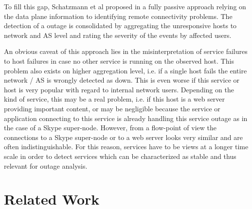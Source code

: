To fill this gap, Schatzmann et al proposed in \citet{Schatzmann:PAM}
a fully passive approach relying on the data plane information to identifying remote connectivity problems. The detection of a outage is consolidated by aggregating the unresponsive hosts to network and AS level and rating the severity of the events by affected users.



An obvious caveat of this approach lies in the misinterpretation of service failures to host failures in case no other service is running on the observed host. This problem also exists on higher aggregation level, i.e. if a single host fails the entire network / AS is wrongly detected as down. This is even worse if this service or host is very popular with regard to internal network users. Depending on the kind of service, this may be a real problem, i.e. if this host is a web server providing important content, or may be negligible because the service or application connecting to this service is already handling this service outage as in the case of a Skype super-node. However, from a flow-point of view the connections to a Skype super-node or to a web server looks very similar and are often indistinguishable. For this reason, services have to be views at a longer time scale in order to detect services which can be characterized as stable and thus relevant for outage analysis. 


\section{Related Work\label{sec:related_work}}


